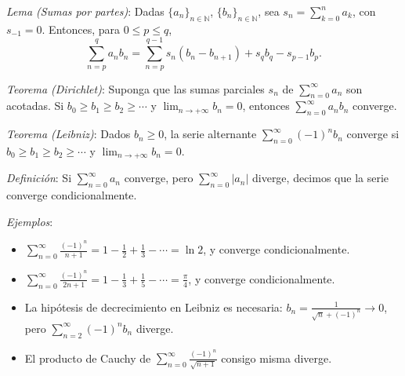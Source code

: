 \documentclass{beamer}
\begin{document}
  \begin{frame}
    \textit{Lema (Sumas por partes)}: Dadas $\{a_n\}_{n \in \mathbb{N}}$,
    $\{b_n\}_{n \in \mathbb{N}}$, sea $s_n = \sum_{k=0}^{n} a_k$, con $s_{-1} = 0$.
    Entonces, para $0 \leq p \leq q$,
    \[
      \sum_{n=p}^{q} a_n b_n = \sum_{n=p}^{q-1} s_n (b_n - b_{n+1}) + s_q b_q - s_{p-1} b_p.
    \]
    \pause

    \textit{Teorema (Dirichlet)}: Suponga que las sumas parciales $s_n$ de
    $\sum_{n=0}^{\infty} a_n$ son acotadas. Si $b_0 \geq b_1 \geq b_2 \geq \cdots$ y
    $\lim_{n \to +\infty} b_n = 0$, entonces $\sum_{n=0}^{\infty} a_n b_n$ converge.
    \newline\newline
    \pause

    \textit{Teorema (Leibniz)}: Dados $b_n \geq 0$, la serie alternante
    $\sum_{n=0}^{\infty} (-1)^n b_n$ converge si $b_0 \geq b_1 \geq b_2 \geq \cdots$ y
    $\lim_{n \to +\infty} b_n = 0$.
  \end{frame}

  \begin{frame}
    \textit{Definición}: Si $\sum_{n=0}^{\infty} a_n$ converge, pero
    $\sum_{n=0}^{\infty} |a_n|$ diverge, decimos que la serie converge
    condicionalmente.
    \newline\newline
    \pause

    \textit{Ejemplos}:
    \begin{itemize}[<+->]
      \item $\sum_{n=0}^{\infty} \frac{(-1)^n}{n+1} = 1 - \frac{1}{2} + \frac{1}{3} - \cdots = \ln 2$,
        y converge condicionalmente.
      \item $\sum_{n=0}^{\infty} \frac{(-1)^n}{2n+1} = 1 - \frac{1}{3} + \frac{1}{5} - \cdots = \frac{\pi}{4}$,
        y converge condicionalmente.
      \item La hipótesis de decrecimiento en Leibniz es necesaria:
        $b_n = \frac{1}{\sqrt{n} + (-1)^n} \to 0$, pero
        $\sum_{n=2}^{\infty} (-1)^n b_n$ diverge.
      \item El producto de Cauchy de $\sum_{n=0}^{\infty} \frac{(-1)^n}{\sqrt{n+1}}$
        consigo misma diverge.
    \end{itemize}
  \end{frame}
\end{document}
